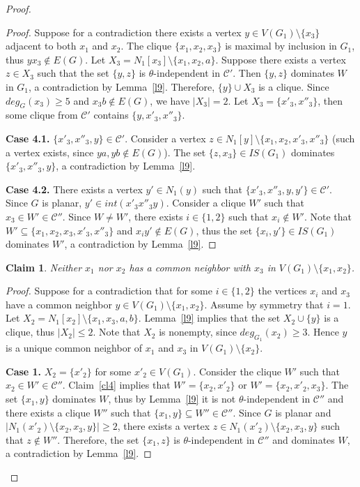 \documentclass[12pt]{article}
\newtheorem{claim}{Claim}
\begin{document}
\begin{proof}
\begin{proof}
Suppose for a contradiction there exists a vertex $y \in V(G_1) \setminus \{x_3\}$ adjacent to both $x_1$ and $x_2$. The clique $\{x_1,x_2,x_3\}$ is maximal by inclusion in $G_1$, thus $yx_3 \notin E(G)$. Let $X_3 = N_1[x_3] \setminus \{x_1,x_2,a\}$. Suppose there exists a vertex $z \in X_3$ such that the set $\{y,z\}$ is $\theta$-independent in $\mathcal{C'}$. Then $\{y,z\}$ dominates $W$ in $G_1$, a contradiction by Lemma~\ref{l9}. Therefore, $\{y\} \cup X_3$ is a clique. Since $deg_G(x_3) \geq 5$ and $x_3b \notin E(G)$, we have $|X_3| = 2$. Let $X_3 = \{x'_3,x''_3\}$, then some clique from $\mathcal{C}'$ contains $\{y,x'_3,x''_3\}$. 

\textbf{Case 4.1.} $\{x'_3,x''_3,y\} \in \mathcal{C}'$. Consider a vertex $z \in N_1[y] \setminus \{x_1,x_2,x'_3,x''_3\}$ (such a vertex exists, since $ya,yb \notin E(G)$). The set $\{z,x_3\} \in IS(G_1)$ dominates $\{x'_3,x''_3,y\}$, a contradiction by Lemma~\ref{l9}. 

\textbf{Case 4.2.} There exists a vertex $y' \in N_1(y)$ such that $\{x'_3,x''_3,y,y'\} \in \mathcal{C}'$. Since $G$ is planar, $y' \in int(x'_3x''_3y)$.  Consider a clique $W'$ such that $x_3 \in W' \in \mathcal{C}''$. Since $W \neq W'$, there exists $i \in \{1,2\}$ such that $x_i \notin W'$. Note that $W' \subseteq \{x_1,x_2,x_3,x'_3,x''_3\}$ and $x_iy' \notin E(G)$, thus the set $\{x_i,y'\} \in IS(G_1)$ dominates $W'$, a contradiction by Lemma~\ref{l9}. 
\end{proof}

\begin{claim}\label{cl5}
Neither $x_1$ nor $x_2$ has a common neighbor with $x_3$ in $V(G_1) \setminus \{x_1,x_2\}$.
\end{claim}


\begin{proof}
Suppose for a contradiction that for some $i \in \{1,2\}$ the vertices $x_i$ and $x_3$ have a common neighbor $y \in V(G_1) \setminus \{x_1,x_2\}$. Assume by symmetry that $i = 1$. Let $X_2 = N_1[x_2] \setminus \{x_1,x_3,a,b\}$. Lemma~\ref{l9} implies that the set $X_2 \cup \{y\}$ is a clique, thus $|X_2| \leq 2$.  Note that $X_2$ is nonempty, since $deg_{G_1}(x_2) \geq 3$. Hence $y$ is a unique common neighbor of $x_1$ and $x_3$ in $V(G_1) \setminus \{x_2\}$.

\textbf{Case 1.} $X_2 = \{x'_2\}$ for some $x'_2 \in V(G_1)$. Consider the clique $W'$ such that $x_2 \in W' \in \mathcal{C}''$. Claim~\ref{cl4} implies that $W' = \{x_2,x'_2\}$ or $W' = \{x_2,x'_2,x_3\}$. The set $\{x_1,y\}$ dominates $W$, thus by Lemma~\ref{l9} it is not $\theta$-independent in $\mathcal{C}''$ and there exists a clique $W''$ such that $\{x_1,y\} \subseteq W'' \in \mathcal{C}''$. Since $G$ is planar and $|N_1(x'_2) \setminus \{x_2,x_3,y\}| \geq 2$, there exists a vertex $z \in N_1(x'_2) \setminus \{x_2,x_3,y\}$ such that $z \notin W''$. Therefore, the set $\{x_1,z\}$ is $\theta$-independent in $\mathcal{C}''$ and dominates $W$, a contradiction by Lemma~\ref{l9}.


\end{proof}
\end{proof}
\end{document}
